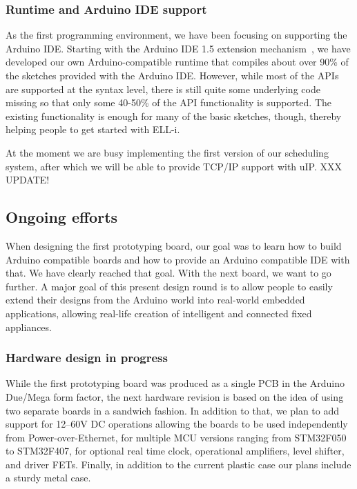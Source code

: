 \documentclass[draft,a4paper]{siamltex}
\begin{document}
\subsubsection{Runtime and Arduino IDE support}

As the first programming environment, we have been focusing on
supporting the Arduino IDE.  Starting with the Arduino IDE 1.5
extension mechanism~\cite{ArduinoIDEextension}, we have developed our
own Arduino-compatible runtime that compiles about over 90\% of the
sketches provided with the Arduino IDE.  However, while most of the
APIs are supported at the syntax level, there is still quite some
underlying code missing so that only some 40-50\% of the API
functionality is supported.  The existing functionality is enough for
many of the basic sketches, though, thereby helping people to get
started with ELL-i.

At the moment we are busy implementing the first version of our
scheduling system, after which we will be able to provide TCP/IP
support with uIP.  XXX UPDATE!

\subsection{Ongoing efforts}

When designing the first prototyping board, our goal was to learn how
to build Arduino compatible boards and how to provide an Arduino
compatible IDE with that.  We have clearly reached that goal.  With
the next board, we want to go further.  A major goal of this present
design round is to allow people to easily extend their designs from
the Arduino world into real-world embedded applications, allowing
real-life creation of intelligent and connected fixed appliances.

\subsubsection{Hardware design in progress}

While the first prototyping board was produced as a single PCB in the
Arduino Due/Mega form factor, the next hardware revision is based on
the idea of using two separate boards in a sandwich fashion.  In
addition to that, we plan to add support for 12--60V DC operations allowing
the boards to be used independently from Power-over-Ethernet, for
multiple MCU versions ranging from STM32F050 to STM32F407, for
optional real time clock, operational amplifiers, level shifter, and
driver FETs.  Finally, in addition to the current plastic case our
plans include a sturdy metal case.
\end{document}
